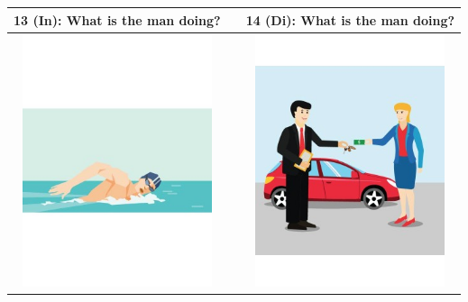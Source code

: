 \begin{tabular}{|c|c|c|}
\hline
13 (In): What is the man doing? && 14 (Di): What is the man doing? \\
\hline
\includegraphics[width=15em,trim=0 0 0 -3]{figures/I13.jpg} & & \includegraphics[width=15em,trim=0 0 0 -3]{figures/I14.jpg} \\
\hline
\end{tabular}
\vspace{1em} \\


